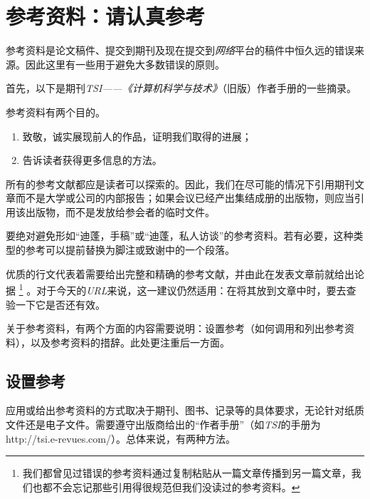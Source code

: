 \chapter{参考资料：请认真参考}

\label{chap6}

参考资料是论文稿件、提交到期刊及现在提交到\emph{网络}平台的稿件中恒久远的错误来源。因此这里有一些用于避免大多数错误的原则。

首先，以下是期刊\emph{TSI——《计算机科学与技术》}（旧版）作者手册的一些摘录。

\begin{mdframed}
    参考资料有两个目的。

    \begin{enumerate}
        \item 致敬，诚实展现前人的作品，证明我们取得的进展；
        \item 告诉读者获得更多信息的方法。
    \end{enumerate}

    所有的参考文献都应是读者可以探索的。因此，我们在尽可能的情况下引用期刊文章而不是大学或公司的内部报告；如果会议已经产出集结成册的出版物，则应当引用该出版物，而不是发放给参会者的临时文件。

    要绝对避免形如``迪蓬，手稿''或``迪蓬，私人访谈''的参考资料。若有必要，这种类型的参考可以提前替换为脚注或致谢中的一个段落。
\end{mdframed}

优质的行文代表着需要给出完整和精确的参考文献，并由此在发表文章前就给出论据
    \footnote{我们都曾见过错误的参考资料通过复制粘贴从一篇文章传播到另一篇文章，我们也都不会忘记那些引用得很规范但我们没读过的参考资料。}
。对于今天的\emph{URL}来说，这一建议仍然适用：在将其放到文章中时，要去查验一下它是否还有效。

关于参考资料，有两个方面的内容需要说明：设置参考（如何调用和列出参考资料），以及参考资料的措辞。此处更注重后一方面。

\section{设置参考}

应用或给出参考资料的方式取决于期刊、图书、记录等的具体要求，无论针对纸质文件还是电子文件。需要遵守出版商给出的``作者手册''（如\emph{TSI}的手册为http://tsi.e-revues.com/）。总体来说，有两种方法。

